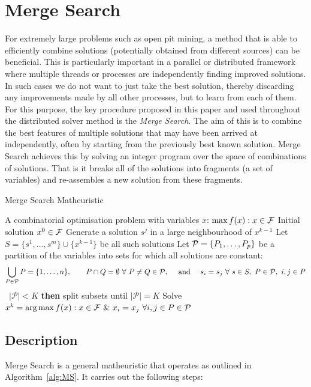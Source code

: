 \documentclass[authoryear,11pt,square,number,times,super,comma]{elsarticle}
\begin{document}
\section{Merge Search}\label{sec:MS}
For extremely large problems such as open pit mining, a method that is able to efficiently combine solutions (potentially obtained from different sources) can be beneficial. This is particularly important in a parallel or distributed framework where multiple threads or processes are independently finding improved solutions. In such cases we do not want to just take the best solution, thereby discarding any improvements made by all other processes, but to learn from each of them. For this purpose, the key procedure proposed in this paper and used throughout 
the distributed solver method is the {\it Merge Search}. The aim of this is to combine the best features of multiple solutions that may have been 
arrived at independently, often by starting from the previously best known solution. Merge Search achieves this by solving an integer program over the space of combinations of solutions. That is it breaks all of the solutions into fragments (a set of variables) and re-assembles a new solution from these fragments. 

\begin{algorithm}[htb!]
\caption{{\sf Merge Search Matheuristic}} \label{alg:MS}
\begin{algorithmic}[1]
  \Require A combinatorial optimisation problem with variables $x$: $\max f(x) : x\in {\cal F}$
  \Require Initial solution $x^0\in \cal F$
    \State Generate a solution $s^j$ in a large neighbourhood of $x^{k-1}$
    \label{step:nbhd}
      \EndFor
    \State Let  $S=\{s^1,\ldots,s^m\}\cup\{x^{k-1}\}$ be all such solutions
    \State Let ${\cal P}=\{P_1,\ldots,P_p\}$ be a partition of the variables into sets for which all solutions are constant:\label{step:P}
  $$ \bigcup_{P\in {\cal P}} P=\{1,\ldots,n\},\qquad P \cap Q=\emptyset\ \forall\ P\ne Q\in
  {\cal P},\quad \text{ and }\quad
  s_i = s_j \ \forall\ s\in S,\ P\in {\cal P},\ i,j\in P$$
   \ {$|\mathcal{P}| < K$} {\bf then} split subsets until $|\mathcal{P}|=K$ \label{step:RandSplit}
  \State Solve $x^k=\text{arg}\max f(x) : x\in {\cal F}\ \&\ x_i=x_j\ \forall
  i,j\in P\in{\cal P}$\label{step:merge}
\EndFor
\end{algorithmic}
\end{algorithm}

\subsection{Description}
Merge Search is a general matheuristic that operates
as outlined in Algorithm~\ref{alg:MS}. It carries out the following steps:
\end{document}
